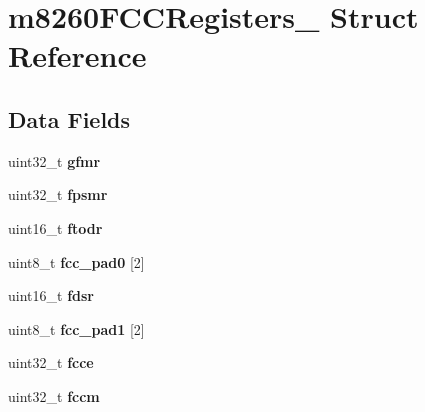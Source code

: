 \hypertarget{structm8260FCCRegisters__}{}\section{m8260\+F\+C\+C\+Registers\+\_\+ Struct Reference}
\label{structm8260FCCRegisters__}
\subsection*{Data Fields}
\begin{DoxyCompactItemize}
\item 
\mbox{\label{structm8260FCCRegisters___af7c68f92f2c2d25d2b1d6af87583c54f}} 
uint32\+\_\+t {\bfseries gfmr}
\item 
\mbox{\label{structm8260FCCRegisters___af28398e069e8b47cbdade26a25779c9e}} 
uint32\+\_\+t {\bfseries fpsmr}
\item 
\mbox{\label{structm8260FCCRegisters___a2506e54f669c5758bb400a44c05a78f2}} 
uint16\+\_\+t {\bfseries ftodr}
\item 
\mbox{\label{structm8260FCCRegisters___a0eff382c847d3bb3c27ba79c2c6a0e7a}} 
uint8\+\_\+t {\bfseries fcc\+\_\+pad0} \mbox{[}2\mbox{]}
\item 
\mbox{\label{structm8260FCCRegisters___a9f3fe017681b761a5a789f5d79dd52bf}} 
uint16\+\_\+t {\bfseries fdsr}
\item 
\mbox{\label{structm8260FCCRegisters___aababe30a47643e243319f386887e8659}} 
uint8\+\_\+t {\bfseries fcc\+\_\+pad1} \mbox{[}2\mbox{]}
\item 
\mbox{\label{structm8260FCCRegisters___a55bf465b3a083af328f5f27bf7fa35be}} 
uint32\+\_\+t {\bfseries fcce}
\item 
\mbox{\label{structm8260FCCRegisters___abc06a0c880b35874b9d905af1c198eaf}} 
uint32\+\_\+t {\bfseries fccm}
\item 
\mbox{\label{structm8260FCCRegisters___ae9305039c5de2bf9635d6234b7f6b5fc}} 

\end{DoxyCompactItemize}
